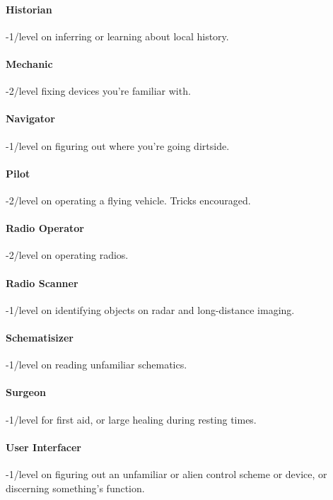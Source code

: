 \paragraph{Historian}
\hypertarget{SkillHistorian}{}
-1/level on inferring or learning about local history.

\paragraph{Mechanic}
\hypertarget{SkillMechanic}{}
-2/level fixing devices you're familiar with.

\paragraph{Navigator}
\hypertarget{SkillNavigator}{}
-1/level on figuring out where you're going dirtside.

\paragraph{Pilot}
\hypertarget{SkillPilot}{}
-2/level on operating a flying vehicle. Tricks encouraged.

\paragraph{Radio Operator}
\hypertarget{SkillRadioOperator}{}
-2/level on operating radios.

\paragraph{Radio Scanner}
\hypertarget{SkillRadioScanner}{}
-1/level on identifying objects on radar and long-distance imaging.

\paragraph{Schematisizer}
\hypertarget{SkillSchematisizer}{}
-1/level on reading unfamiliar schematics.

\paragraph{Surgeon}
\hypertarget{SkillSurgeon}{}
-1/level for first aid, or large healing during resting times.

\paragraph{User Interfacer}
\hypertarget{SkillUserInterfacer}{}
-1/level on figuring out an unfamiliar or alien control scheme or device, or discerning something's function.

